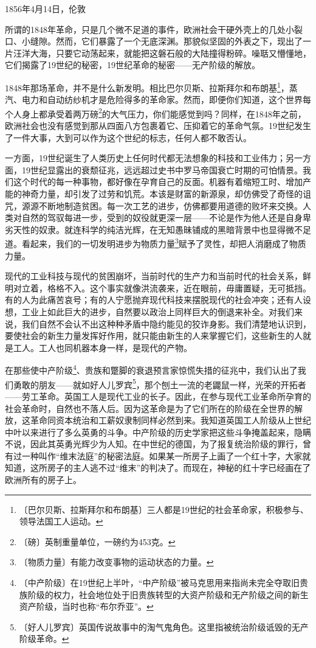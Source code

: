 \documentclass[12pt,UTF-8,openany]{ctexbook}
\begin{document}
\begin{normalsize}
    
    \begin{center}1856年4月14日，伦敦\end{center}
    
    所谓的1848年革命，只是几个微不足道的事件，欧洲社会干硬外壳上的几处小裂口、小缝隙。然而，它们暴露了一个无底深渊。那貌似坚固的外表之下，现出了一片汪洋大海，只要它动荡起来，就能把这磐石般的大陆撞得粉碎。噪聒又懵懂地，它们揭露了19世纪的秘密，19世纪革命的秘密——无产阶级的解放。
    
    1848年那场革命，并不是什么新发明。相比巴尔贝斯、拉斯拜尔和布朗基\footnote{〔巴尔贝斯、拉斯拜尔和布朗基〕三人都是19世纪的社会革命家，积极参与、领导法国工人运动。}，蒸汽、电力和自动纺纱机才是危险得多的革命家。然而，即便你们知道，这个世界每个人身上都承受着两万磅\footnote{〔磅〕英制重量单位，一磅约为453克。}的大气压力，你们能感觉到吗？同样，在1848年之前，欧洲社会也没有感觉到那从四面八方包裹着它、压抑着它的革命气氛。19世纪发生了一件大事，大到可以作为这个世纪的标志，任何人都不敢否认。
    
    一方面，19世纪诞生了人类历史上任何时代都无法想象的科技和工业伟力；另一方面，19世纪显露出的衰颓征兆，远远超过史书中罗马帝国衰亡时期的可怕情景。我们这个时代的每一种事物，都好像在孕育自己的反面。机器有着缩短工时、增加产能的神奇力量，却引发了过劳和饥荒。本该是财富的新源泉，却仿佛受了奇怪的诅咒，源源不断地制造贫困。每一次工艺的进步，仿佛都要用道德的败坏来交换。人类对自然的驾驭每进一步，受到的奴役就更深一层——不论是作为他人还是自身卑劣天性的奴隶。就连科学的纯洁光辉，在无知愚昧铺成的黑暗背景中也显得微不足道。看起来，我们的一切发明进步为物质力量\footnote{〔物质力量〕有能力改变事物的运动状态的力量。}赋予了灵性，却把人消磨成了物质力量。
    
    现代的工业科技与现代的贫困崩坏，当前时代的生产力和当前时代的社会关系，鲜明对立着，格格不入。这个事实就像洪流袭来，近在眼前，毋庸置疑，无可抵挡。有的人为此痛苦哀号；有的人宁愿抛弃现代科技来摆脱现代的社会冲突；还有人设想，工业上如此巨大的进步，自然要以政治上同样巨大的倒退来补全。对我们来说，我们自然不会认不出这种种矛盾中隐约能见的狡诈身影。我们清楚地认识到，要使社会的新生力量发挥好作用，就只能由新生的人来掌握它们，这些新生的人就是工人。工人也同机器本身一样，是现代的产物。
    
    在那些使中产阶级\footnote{〔中产阶级〕在19世纪上半叶，“中产阶级”被马克思用来指尚未完全夺取旧贵族阶级的权力，社会地位处于旧贵族转型的大资产阶级和无产阶级之间的新生资产阶级，当时也称“布尔乔亚”。}、贵族和蹩脚的衰退预言家惊慌失措的征兆中，我们认出了我们勇敢的朋友——就如好人儿罗宾\footnote{〔好人儿罗宾〕英国传说故事中的淘气鬼角色。这里指被统治阶级诋毁的无产阶级革命。}，那个刨土一流的老鼹鼠一样，光荣的开拓者——劳工革命。英国工人是现代工业的长子。因此，在参与现代工业革命所孕育的社会革命时，自然也不落人后。因为这革命是为了它们所在的阶级在全世界的解放，这革命同资本统治和工薪奴隶制同样必然到来。我知道英国工人阶级从上世纪中叶以来进行了多么英勇的斗争。中产阶级的历史学家把这些斗争掩盖起来，隐瞒不说，因此其英勇光辉少为人知。在中世纪的德国，为了报复统治阶级的罪行，曾有过一种叫作“维末法庭”的秘密法庭。如果某一所房子上画了一个红十字，大家就知道，这所房子的主人逃不过“维末”的判决了。而现在，神秘的红十字已经画在了欧洲所有的房子上。
    

\end{normalsize}
\end{document}
